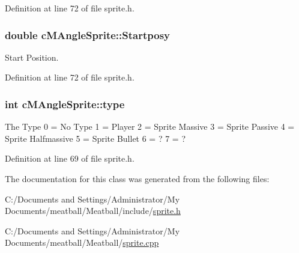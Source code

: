 Definition at line 72 of file sprite.\-h.

\hypertarget{classc_m_angle_sprite_ad51e327eabe1ddb18941ff17a7b69191}{
\subsubsection[{Startposy}]{\setlength{\rightskip}{0pt plus 5cm}double c\-M\-Angle\-Sprite\-::\-Startposy}}\label{classc_m_angle_sprite_ad51e327eabe1ddb18941ff17a7b69191}


Start Position. 



Definition at line 72 of file sprite.\-h.

\hypertarget{classc_m_angle_sprite_ac3ca3aa45f5731675f8a61b89f094cc4}{
\subsubsection[{type}]{\setlength{\rightskip}{0pt plus 5cm}int c\-M\-Angle\-Sprite\-::type}}\label{classc_m_angle_sprite_ac3ca3aa45f5731675f8a61b89f094cc4}
The Type 0 = No Type 1 = Player 2 = Sprite Massive 3 = Sprite Passive 4 = Sprite Halfmassive 5 = Sprite Bullet 6 = ? 7 = ? 

Definition at line 69 of file sprite.\-h.



The documentation for this class was generated from the following files\-:\begin{DoxyCompactItemize}
\item 
C\-:/\-Documents and Settings/\-Administrator/\-My Documents/meatball/\-Meatball/include/\hyperlink{include_2sprite_8h}{sprite.\-h}\item 
C\-:/\-Documents and Settings/\-Administrator/\-My Documents/meatball/\-Meatball/\hyperlink{sprite_8cpp}{sprite.\-cpp}\end{DoxyCompactItemize}
